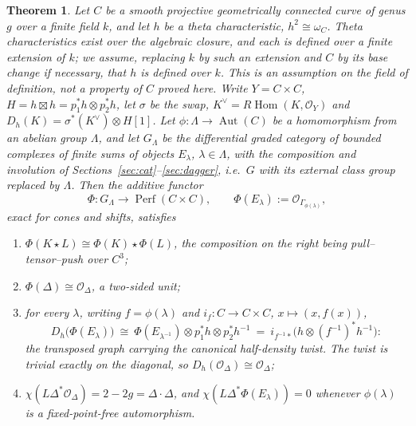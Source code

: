 \documentclass[11pt]{amsart}
\newtheorem{theorem}{Theorem}[section]
\theoremstyle{definition}
\theoremstyle{remark}
\newcommand{\Hom}{\operatorname{Hom}}
\newcommand{\Perf}{\operatorname{Perf}}
\newcommand{\Aut}{\operatorname{Aut}}
\begin{document}
\begin{theorem}\label{thm:classical}
Let $C$ be a smooth projective geometrically connected curve of genus $g$ over
a finite field $k$, and let $h$ be a theta characteristic, $h^{2}\cong\omega_C$.
Theta characteristics exist over the algebraic closure, and each is defined
over a finite extension of $k$; we assume, replacing $k$ by such an extension
and $C$ by its base change if necessary, that $h$ is defined over $k$.  This is
an assumption on the field of definition, not a property of $C$ proved here.  Write
$Y=C\times C$, $H=h\boxtimes h=p_1^{*}h\otimes p_2^{*}h$, let $\sigma$ be the
swap, $K^{\vee}=R\!\Hom(K,\mathcal O_Y)$ and
$D_h(K)=\sigma^{*}(K^{\vee})\otimes H[1]$.  Let $\phi:\Lambda\to\Aut(C)$ be a
homomorphism from an abelian group $\Lambda$, and let $G_{\Lambda}$ be the
differential graded category of bounded complexes of finite sums of objects
$E_{\lambda}$, $\lambda\in\Lambda$, with the composition and involution of
Sections~\ref{sec:cat}--\ref{sec:dagger}, i.e.\ $G$ with its external class
group replaced by $\Lambda$.  Then the additive functor
\[
\Phi:G_{\Lambda}\longrightarrow\Perf(C\times C),\qquad
\Phi(E_{\lambda}):=\mathcal O_{\Gamma_{\phi(\lambda)}},
\]
exact for cones and shifts, satisfies
\begin{enumerate}
\item[(a)] $\Phi(K\star L)\cong\Phi(K)\star\Phi(L)$, the composition on the
right being pull--tensor--push over $C^{3}$;
\item[(b)] $\Phi(\Delta)\cong\mathcal O_{\Delta}$, a two-sided unit;
\item[(c)] for every $\lambda$, writing $f=\phi(\lambda)$ and
$i_{f}:C\to C\times C$, $x\mapsto(x,f(x))$,
\begin{equation}\label{eq:dualitygraph}
D_h\bigl(\Phi(E_{\lambda})\bigr)\ \cong\
\Phi(E_{\lambda^{-1}})\otimes p_1^{*}h\otimes p_2^{*}h^{-1}
\ =\ i_{f^{-1}*}\bigl(h\otimes(f^{-1})^{*}h^{-1}\bigr):
\end{equation}
the transposed graph carrying the canonical half-density twist.  The twist is
trivial exactly on the diagonal, so $D_h(\mathcal O_{\Delta})\cong
\mathcal O_{\Delta}$;
\item[(d)] $\chi(L\Delta^{*}\mathcal O_{\Delta})=2-2g=\Delta\cdot\Delta$, and
$\chi(L\Delta^{*}\Phi(E_{\lambda}))=0$ whenever $\phi(\lambda)$ is a
fixed-point-free automorphism.
\end{enumerate}
\end{theorem}
\end{document}
